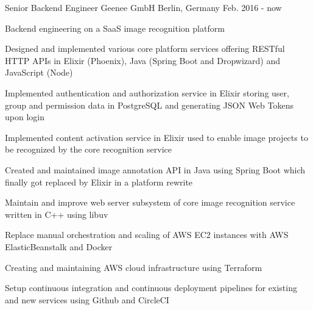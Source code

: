 

\begin{cventries}

  \cventry
    {Senior Backend Engineer} %
    {Geenee GmbH} %
    {Berlin, Germany} %
    {Feb. 2016 - now} %
    {
      \begin{cvitems} %
        \item {Backend engineering on a SaaS image recognition platform}
        \item {Designed and implemented various core platform services offering RESTful HTTP APIs in Elixir (Phoenix), Java (Spring Boot and Dropwizard) and JavaScript (Node)}
        \begin{cvsubitems}
          \item {Implemented authentication and authorization service in Elixir storing user, group and permission data in PostgreSQL and generating JSON Web Tokens upon login}
          \item {Implemented content activation service in Elixir used to enable image projects to be recognized by the core recognition service}
          \item {Created and maintained image annotation API in Java using Spring Boot which finally got replaced by Elixir in a platform rewrite}
        \end{cvsubitems}
        \item {Maintain and improve web server subsystem of core image recognition service written in C++ using libuv}
        \item {Replace manual orchestration and scaling of AWS EC2 instances with AWS ElasticBeanstalk and Docker}
        \item {Creating and maintaining AWS cloud infrastructure using Terraform}
        \item {Setup continuous integration and continuous deployment pipelines for existing and new services using Github and CircleCI}
      \end{cvitems}
    }


\end{cventries}
